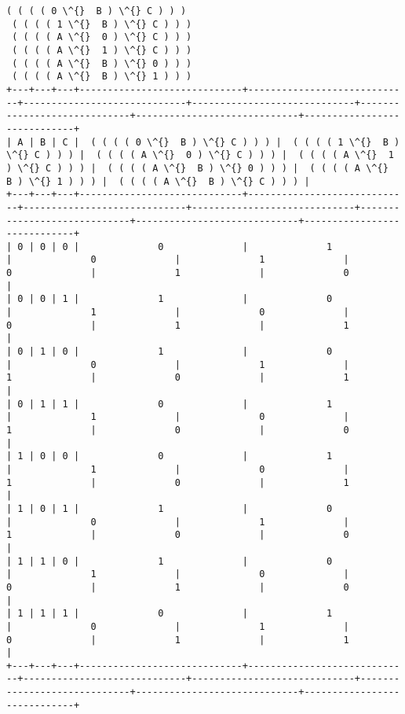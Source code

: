 \documentclass[11pt]{article}
\begin{document}
    \begin{Verbatim}[commandchars=\\\{\}]
 ( ( ( ( 0 \^{}  B ) \^{} C ) ) )
 ( ( ( ( 1 \^{}  B ) \^{} C ) ) )
 ( ( ( ( A \^{}  0 ) \^{} C ) ) )
 ( ( ( ( A \^{}  1 ) \^{} C ) ) )
 ( ( ( ( A \^{}  B ) \^{} 0 ) ) )
 ( ( ( ( A \^{}  B ) \^{} 1 ) ) )
+---+---+---+-----------------------------+-----------------------------+-----------------------------+-----------------------------+-----------------------------+-----------------------------+-----------------------------+
| A | B | C |  ( ( ( ( 0 \^{}  B ) \^{} C ) ) ) |  ( ( ( ( 1 \^{}  B ) \^{} C ) ) ) |  ( ( ( ( A \^{}  0 ) \^{} C ) ) ) |  ( ( ( ( A \^{}  1 ) \^{} C ) ) ) |  ( ( ( ( A \^{}  B ) \^{} 0 ) ) ) |  ( ( ( ( A \^{}  B ) \^{} 1 ) ) ) |  ( ( ( ( A \^{}  B ) \^{} C ) ) ) |
+---+---+---+-----------------------------+-----------------------------+-----------------------------+-----------------------------+-----------------------------+-----------------------------+-----------------------------+
| 0 | 0 | 0 |              0              |              1              |              0              |              1              |              0              |              1              |              0              |
| 0 | 0 | 1 |              1              |              0              |              1              |              0              |              0              |              1              |              1              |
| 0 | 1 | 0 |              1              |              0              |              0              |              1              |              1              |              0              |              1              |
| 0 | 1 | 1 |              0              |              1              |              1              |              0              |              1              |              0              |              0              |
| 1 | 0 | 0 |              0              |              1              |              1              |              0              |              1              |              0              |              1              |
| 1 | 0 | 1 |              1              |              0              |              0              |              1              |              1              |              0              |              0              |
| 1 | 1 | 0 |              1              |              0              |              1              |              0              |              0              |              1              |              0              |
| 1 | 1 | 1 |              0              |              1              |              0              |              1              |              0              |              1              |              1              |
+---+---+---+-----------------------------+-----------------------------+-----------------------------+-----------------------------+-----------------------------+-----------------------------+-----------------------------+

    \end{Verbatim}
\end{document}
